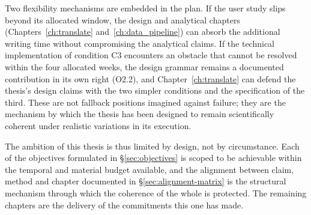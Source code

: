 Two flexibility mechanisms are embedded in the plan. If the user study slips beyond its allocated window, the design and analytical chapters (Chapters~\ref{ch:translate} and~\ref{ch:data_pipeline}) can absorb the additional writing time without compromising the analytical claims. If the technical implementation of condition C3 encounters an obstacle that cannot be resolved within the four allocated weeks, the design grammar remains a documented contribution in its own right (O2.2), and Chapter~\ref{ch:translate} can defend the thesis's design claims with the two simpler conditions and the specification of the third. These are not fallback positions imagined against failure; they are the mechanism by which the thesis has been designed to remain scientifically coherent under realistic variations in its execution.

The ambition of this thesis is thus limited by design, not by circumstance. Each of the objectives formulated in §\ref{sec:objectives} is scoped to be achievable within the temporal and material budget available, and the alignment between claim, method and chapter documented in §\ref{sec:alignment-matrix} is the structural mechanism through which the coherence of the whole is protected. The remaining chapters are the delivery of the commitments this one has made.